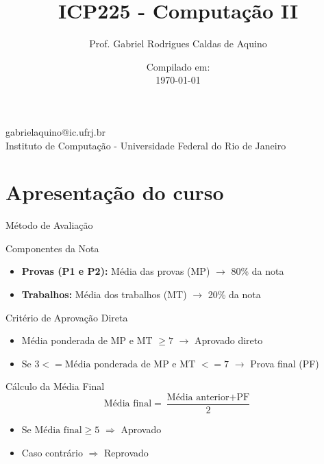 \title{ICP225 - Computação II}

\author{Prof. Gabriel Rodrigues Caldas de Aquino}

\institute
{
    gabrielaquino@ic.ufrj.br\\
    
    Instituto de Computação -
    Universidade Federal do Rio de Janeiro %
}
\date{Compilado em: \\ \today} %


\section{Apresentação do curso}
\begin{frame}
    \titlepage
\end{frame}



\begin{frame}{Método de Avaliação}
  \begin{block}{Componentes da Nota}
    \begin{itemize}
      \item \textbf{Provas (P1 e P2):}  
  Média das provas (MP) $\rightarrow$ 80\% da nota
      \item \textbf{Trabalhos:} 
  Média dos trabalhos (MT) $\rightarrow$ 20\% da nota 
    \end{itemize}
  \end{block}

  \begin{block}{Critério de Aprovação Direta}
    \begin{itemize}
      \item Média ponderada de MP e MT $\geq 7$ 
      \hspace{1em} $\rightarrow$ Aprovado direto
      \item Se $3 <= \text{Média ponderada de MP e MT } <= 7$ 
      \hspace{1em} $\rightarrow$ Prova final (PF)
    \end{itemize}
  \end{block}

  \begin{block}{Cálculo da Média Final}
    \[
      \text{Média final} = \frac{\text{Média anterior} + \text{PF}}{2}
    \]
    \begin{itemize}
      \item Se $\text{Média final} \geq 5$ $\Rightarrow$ Aprovado
      \item Caso contrário $\Rightarrow$ Reprovado
    \end{itemize}
  \end{block}
\end{frame}